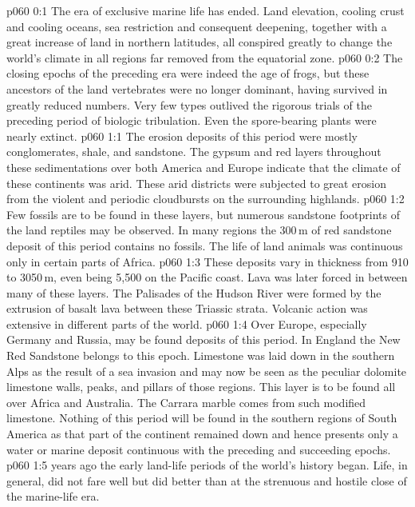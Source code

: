\author{Life Carrier}
\vs p060 0:1 The era of exclusive marine life has ended. Land elevation, cooling crust and cooling oceans, sea restriction and consequent deepening, together with a great increase of land in northern latitudes, all conspired greatly to change the world’s climate in all regions far removed from the equatorial zone.
\vs p060 0:2 The closing epochs of the preceding era were indeed the age of frogs, but these ancestors of the land vertebrates were no longer dominant, having survived in greatly reduced numbers. Very few types outlived the rigorous trials of the preceding period of biologic tribulation. Even the spore\hyp{}bearing plants were nearly extinct.
\vs p060 1:1 The erosion deposits of this period were mostly conglomerates, shale, and sandstone. The gypsum and red layers throughout these sedimentations over both America and Europe indicate that the climate of these continents was arid. These arid districts were subjected to great erosion from the violent and periodic cloudbursts on the surrounding highlands.
\vs p060 1:2 Few fossils are to be found in these layers, but numerous sandstone footprints of the land reptiles may be observed. In many regions the 300\,m of red sandstone deposit of this period contains no fossils. The life of land animals was continuous only in certain parts of Africa.
\vs p060 1:3 These deposits vary in thickness from 910 to 3050\,m, even being 5,500 on the Pacific coast. Lava was later forced in between many of these layers. The Palisades of the Hudson River were formed by the extrusion of basalt lava between these Triassic strata. Volcanic action was extensive in different parts of the world.
\vs p060 1:4 Over Europe, especially Germany and Russia, may be found deposits of this period. In England the New Red Sandstone belongs to this epoch. Limestone was laid down in the southern Alps as the result of a sea invasion and may now be seen as the peculiar dolomite limestone walls, peaks, and pillars of those regions. This layer is to be found all over Africa and Australia. The Carrara marble comes from such modified limestone. Nothing of this period will be found in the southern regions of South America as that part of the continent remained down and hence presents only a water or marine deposit continuous with the preceding and succeeding epochs.
\vs p060 1:5 \pc {} years ago the early land\hyp{}life periods of the world’s history began. Life, in general, did not fare well but did better than at the strenuous and hostile close of the marine\hyp{}life era.

